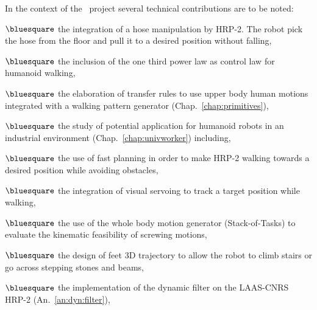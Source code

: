 In the context of the \koroibot\ project several technical contributions are to be noted:
\begin{list}{ .}{%
		\setlength{\topsep}{5pt}%
		\setlength{\itemsep}{0pt}%
		\setlength{\parsep}{0pt}%
		\setlength{\labelwidth}{3.em}%
		\setlength{\leftmargin}{2em}%
		\setlength{\labelsep}{0.5em}%
	}
\item[$\bluesquare$] the integration of a hose manipulation by HRP-2. The robot pick the hose from the floor and pull it to a desired position without falling,
\item[$\bluesquare$] the inclusion of the one third power law as control law for humanoid walking,
\item[$\bluesquare$] the elaboration of transfer rules to use upper body human motions integrated with a walking pattern generator (Chap.~\ref{chap:primitives}),
\item[$\bluesquare$] the study of potential application for humanoid robots in an industrial environment (Chap.~\ref{chap:univworker}) including,
\begin{list}{ .}{%
		\setlength{\topsep}{5pt}%
		\setlength{\itemsep}{0pt}%
		\setlength{\parsep}{0pt}%
		\setlength{\labelwidth}{3.em}%
		\setlength{\leftmargin}{2em}%
		\setlength{\labelsep}{0.5em}%
	}
	\item[$\bluesquare$] the use of fast planning in order to make HRP-2 walking towards a desired position while avoiding obstacles,
	\item[$\bluesquare$] the integration of visual servoing to track a target position while walking,
  \item[$\bluesquare$] the use of the whole body motion generator (Stack-of-Tasks) to evaluate the kinematic feasibility of screwing motions,
	\item[$\bluesquare$] the design of feet 3D trajectory to allow the robot to climb stairs or go across stepping stones and beams,  
\end{list}
\item[$\bluesquare$] the implementation of the dynamic filter on the LAAS-CNRS HRP-2 (An.~\ref{an:dyn:filter}),
\end{list}
